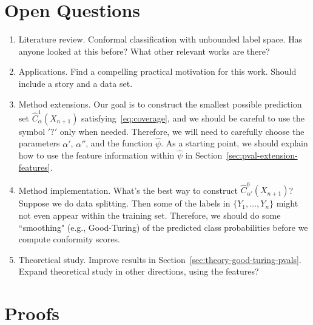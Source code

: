 \documentclass[11pt]{article}
\begin{document}
\section{Open Questions}

\begin{enumerate}
\item {\color{red}Literature review.} Conformal classification with unbounded label space. Has anyone looked at this before? What other relevant works are there?
\item {\color{red}Applications.} Find a compelling practical motivation for this work. Should include a story and a data set.
\item Method extensions. Our goal is to construct the smallest possible prediction set $\hat{C}^1_{\alpha}(X_{n+1})$ satisfying~\eqref{eq:coverage}, and we should be careful to use the symbol $'?'$ only when needed.
Therefore, we will need to carefully choose the parameters $\alpha'$, $\alpha''$, and the function $\hat{\psi}$. 
As a starting point, we should explain how to use the feature information within $\hat{\psi}$ in Section~\ref{sec:pval-extension-features}.
\item Method implementation. What's the best way to construct $\hat{C}^0_{\alpha'}(X_{n+1})$? Suppose we do data splitting. Then some of the labels in $\{Y_1, \ldots, Y_n\}$ might not even appear within the training set. Therefore, we should do some ``smoothing" (e.g., Good-Turing) of the predicted class probabilities before we compute conformity scores. 
\item Theoretical study. Improve results in Section~\ref{sec:theory-good-turing-pvals}. Expand theoretical study in other directions, using the features?
\end{enumerate}


\printbibliography %

\clearpage

\appendix

\section{Proofs} \label{app:proofs}
\end{document}
